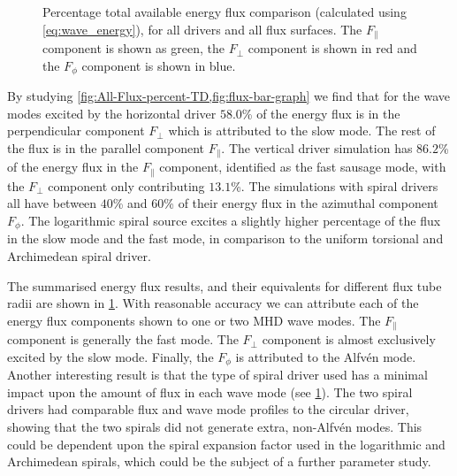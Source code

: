 \documentclass[a4paper,12pt,fourier,authoryear,custommargin]{Classes/PhDThesisPSnPDF}
\begin{document}
\begin{figure}[h]
    \centering
    \caption{Percentage total available energy flux comparison (calculated using \cref{eq:wave_energy}), for all drivers and all flux surfaces. The $F_\parallel$ component is shown as green, the $F_\perp$ component is shown in red and the $F_\phi$ component is shown in blue.}
    \label{fig:flux-bar-graph}
\end{figure}


By studying \cref{fig:All-Flux-percent-TD,fig:flux-bar-graph} we find that for the wave modes excited by the horizontal driver $58.0$\% of the energy flux is in the perpendicular component $F_\perp$ which is attributed to the slow mode.
The rest of the flux is in the parallel component $F_\parallel$.
The vertical driver simulation has $86.2$\% of the energy flux in the $F_\parallel$ component, identified as the fast sausage mode, with the $F_\perp$ component only contributing $13.1$\%.
The simulations with spiral drivers all have between $40$\% and $60$\% of their energy flux in the azimuthal component $F_\phi$.
The logarithmic spiral source excites a slightly higher percentage of the flux in the slow mode and the fast mode, in comparison to the uniform torsional and Archimedean spiral driver.

The summarised energy flux results, and their equivalents for different flux tube radii are shown in \cref{fig:flux-bar-graph}.
With reasonable accuracy we can attribute each of the energy flux components shown to one or two MHD wave modes.
The $F_\parallel$ component is generally the fast mode.
The $F_\perp$ component is almost exclusively excited by the slow mode.
Finally, the $F_\phi$ is attributed to the Alfv\'en mode.
Another interesting result is that the type of spiral driver used has a minimal impact upon the amount of flux in each wave mode (see \cref{fig:flux-bar-graph}).
The two spiral drivers had comparable flux and wave mode profiles to the circular driver, showing that the two spirals did not generate extra, non-Alfv\'en modes.
This could be dependent upon the spiral expansion factor used in the logarithmic and Archimedean spirals, which could be the subject of a further parameter study.
\end{document}
